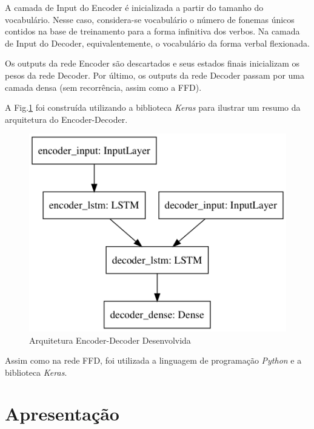 A camada de Input do Encoder é inicializada a partir do tamanho do vocabulário. Nesse caso, considera-se vocabulário o número de fonemas únicos contidos na base de treinamento para a forma infinitiva dos verbos. Na camada de Input do Decoder, equivalentemente, o vocabulário da forma verbal flexionada.

Os outputs da rede Encoder são descartados e seus estados finais inicializam os pesos da rede Decoder. Por último, os outputs da rede Decoder passam por uma camada densa (sem recorrência, assim como a FFD).

A Fig.\ref{fig:encdec} foi construída utilizando a biblioteca \textit{Keras} para ilustrar um resumo da arquitetura do Encoder-Decoder.

\begin{figure}[H]
  \centering
  \includegraphics[width=0.5\linewidth]{img/draw-model6.png}
  \caption{Arquitetura Encoder-Decoder Desenvolvida}
  \label{fig:encdec}
\end{figure}

Assim como na rede FFD, foi utilizada a linguagem de programação \textit{Python} e a biblioteca \textit{Keras}.

\section{Apresentação}



